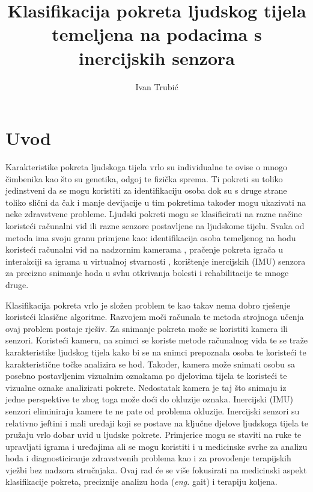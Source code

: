 \documentclass[times, utf8, diplomski]{fer}
\begin{document}

\title{Klasifikacija pokreta ljudskog tijela temeljena na podacima s inercijskih senzora}

\author{Ivan Trubić}

\maketitle

\izvornik

\zahvala{}

\tableofcontents

\chapter{Uvod}
Karakteristike pokreta ljudskoga tijela vrlo su individualne te ovise o mnogo čimbenika kao što su genetika, odgoj te
fizička sprema. Ti pokreti su toliko jedinstveni da se mogu koristiti za identifikaciju osoba dok su s druge strane
toliko slični da čak i manje devijacije u tim pokretima također mogu ukazivati na neke zdravstvene probleme.
Ljudski pokreti mogu se klasificirati na razne načine koristeći računalni vid ili razne senzore postavljene na
ljudskome tijelu. Svaka od metoda ima svoju granu primjene kao: identifikacija osoba temeljenog na hodu koristeći
računalni vid na nadzornim kamerama \citep{surveillance}, pračenje pokreta igrača u interakciji sa igrama u virtualnoj stvarnosti \citep{VR},
korištenje inercijskih (IMU) senzora za precizno snimanje hoda u svhu otkrivanja bolesti i rehabilitacije te mnoge druge.

Klasifikacija pokreta vrlo je složen problem te kao takav nema dobro rješenje koristeći klasične algoritme. Razvojem moči računala
te metoda strojnoga učenja ovaj problem postaje rješiv. Za snimanje pokreta može se koristiti kamera ili senzori.
Koristeći kameru, na snimci se koriste metode računalnog vida te se traže karakteristike ljudskog tijela kako bi se na snimci
prepoznala osoba te koristeći te karakteristične točke analizira se hod. Također, kamera može snimati osobu sa posebno postavljenim
vizualnim oznakama po djelovima tijela te koristeći te vizualne oznake analizirati pokrete. Nedostatak kamera je taj što snimaju iz
jedne perspektive te zbog toga može doći do okluzije oznaka. Inercijski (IMU) senzori eliminiraju kamere te ne pate od problema okluzije.
Inercijski senzori su relativno jeftini i mali uređaji koji se postave na ključne djelove ljudskoga tijela te pružaju vrlo dobar uvid
u ljudske pokrete. Primjerice mogu se staviti na ruke te upravljati igrama i uređajima ali se mogu koristiti i u medicinske svrhe za
analizu hoda i diagnosticiranje zdravstvenih problema kao i za provođenje terapijskih vježbi bez nadzora stručnjaka.
Ovaj rad će se više fokusirati na medicinski aspekt klasifikacije pokreta, preciznije analizu hoda (\textit{eng.} gait) i terapiju koljena.
\end{document}
